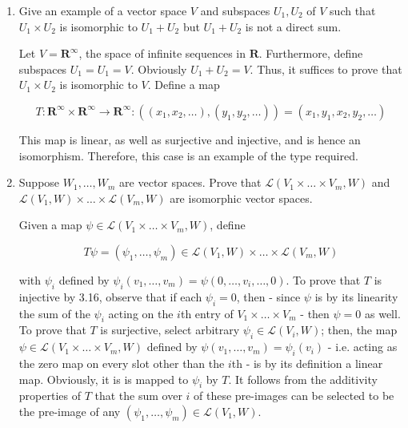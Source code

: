 \documentclass{book}
\begin{document}
\begin{enumerate}
\item Give an example of a vector space \(V\) and subspaces \(U_1,U_2\) of \(V\) such that \(U_1 \times U_2\) is isomorphic to \(U_1+U_2\) but \(U_1+U_2\) is not a direct sum.

Let \(V = \textbf{R}^{\infty}\), the space of infinite sequences in \(\textbf{R}\).  Furthermore, define subspaces \(U_1 = U_1 = V\).  Obviously \(U_1+U_2 = V\).  Thus, it suffices to prove that \(U_1 \times U_2\) is isomorphic to \(V\).  Define a map

\begin{equation*}
    T: \textbf{R}^{\infty} \times \textbf{R}^{\infty} \rightarrow \textbf{R}^{\infty}: ((x_1,x_2,\dots),(y_1,y_2,\dots)) = (x_1,y_1,x_2,y_2,\dots)
\end{equation*}

This map is linear, as well as surjective and injective, and is hence an isomorphism.  Therefore, this case is an example of the type required.

\item Suppose \(W_1,\dots,W_m\) are vector spaces.  Prove that \(\mathcal{L}(V_1 \times \dots \times V_m,W)\) and \(\mathcal{L}(V_1,W) \times \dots \times \mathcal{L}(V_m,W)\) are isomorphic vector spaces.

Given a map \(\psi \in \mathcal{L}(V_1 \times \dots \times V_m,W)\), define

\begin{equation*}
    T\psi = (\psi_1,\dots,\psi_m) \in \mathcal{L}(V_1,W) \times \dots \times \mathcal{L}(V_m,W)
\end{equation*}

with \(\psi_i\) defined by \(\psi_i(v_1,\dots,v_m) = \psi(0,\dots,v_i,\dots,0)\).  To prove that \(T\) is injective by 3.16, observe that if each \(\psi_i = 0\), then - since \(\psi\) is by its linearity the sum of the \(\psi_i\) acting on the \(i\)th entry of \(V_1 \times \dots \times V_m\) - then \(\psi = 0\) as well.  To prove that \(T\) is surjective, select arbitrary \(\psi_i \in \mathcal{L}(V_i,W)\); then, the map \(\psi \in \mathcal{L}(V_1 \times \dots \times V_m,W)\) defined by \(\psi(v_1,\dots,v_m) = \psi_i(v_i)\) - i.e. acting as the zero map on every slot other than the \(i\)th - is by its definition a linear map.  Obviously, it is is mapped to \(\psi_i\) by \(T\).  It follows from the additivity properties of \(T\) that the sum over \(i\) of these pre-images can be selected to be the pre-image of any \((\psi_1,\dots,\psi_m) \in \mathcal{L}(V_1,W)\).


\end{enumerate}
\end{document}

